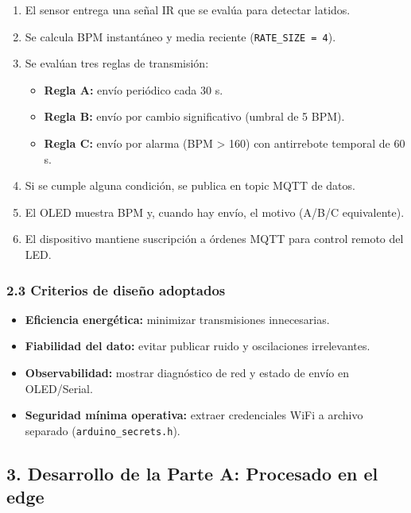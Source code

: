 \documentclass[11pt]{article}
\providecommand{\tightlist}{%
      \setlength{\itemsep}{0pt}\setlength{\parskip}{0pt}}
\begin{document}
\begin{enumerate}
\def\labelenumi{\arabic{enumi}.}
\tightlist
\item
  El sensor entrega una señal IR que se evalúa para detectar latidos.
\item
  Se calcula BPM instantáneo y media reciente
  (\texttt{RATE\_SIZE\ =\ 4}).
\item
  Se evalúan tres reglas de transmisión:

  \begin{itemize}
  \tightlist
  \item
    \textbf{Regla A:} envío periódico cada 30 s.
  \item
    \textbf{Regla B:} envío por cambio significativo (umbral de 5 BPM).
  \item
    \textbf{Regla C:} envío por alarma (BPM \textgreater{} 160) con
    antirrebote temporal de 60 s.
  \end{itemize}
\item
  Si se cumple alguna condición, se publica en topic MQTT de datos.
\item
  El OLED muestra BPM y, cuando hay envío, el motivo (A/B/C
  equivalente).
\item
  El dispositivo mantiene suscripción a órdenes MQTT para control remoto
  del LED.
\end{enumerate}

\subsubsection{2.3 Criterios de diseño
adoptados}\label{criterios-de-diseuxf1o-adoptados}

\begin{itemize}
\tightlist
\item
  \textbf{Eficiencia energética:} minimizar transmisiones innecesarias.
\item
  \textbf{Fiabilidad del dato:} evitar publicar ruido y oscilaciones
  irrelevantes.
\item
  \textbf{Observabilidad:} mostrar diagnóstico de red y estado de envío
  en OLED/Serial.
\item
  \textbf{Seguridad mínima operativa:} extraer credenciales WiFi a
  archivo separado (\texttt{arduino\_secrets.h}).
\end{itemize}

    \subsection{3. Desarrollo de la Parte A: Procesado en el
edge}\label{desarrollo-de-la-parte-a-procesado-en-el-edge}
\end{document}
